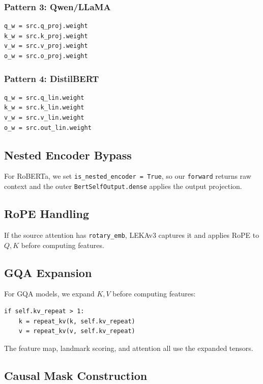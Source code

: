 \subsubsection{Pattern 3: Qwen/LLaMA}

\begin{lstlisting}
q_w = src.q_proj.weight
k_w = src.k_proj.weight
v_w = src.v_proj.weight
o_w = src.o_proj.weight
\end{lstlisting}

\subsubsection{Pattern 4: DistilBERT}

\begin{lstlisting}
q_w = src.q_lin.weight
k_w = src.k_lin.weight
v_w = src.v_lin.weight
o_w = src.out_lin.weight
\end{lstlisting}

\subsection{Nested Encoder Bypass}

For RoBERTa, we set \texttt{is\_nested\_encoder = True}, so our \texttt{forward} returns raw 
context and the outer \texttt{BertSelfOutput.dense} applies the output projection.

\subsection{RoPE Handling}

If the source attention has \texttt{rotary\_emb}, LEKAv3 captures it and applies 
RoPE to $Q, K$ before computing features.

\subsection{GQA Expansion}

For GQA models, we expand $K, V$ before computing features:

\begin{lstlisting}
if self.kv_repeat > 1:
    k = repeat_kv(k, self.kv_repeat)
    v = repeat_kv(v, self.kv_repeat)
\end{lstlisting}

The feature map, landmark scoring, and attention all use the expanded tensors.

\subsection{Causal Mask Construction}

